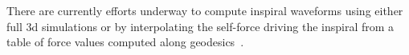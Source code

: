 \documentclass[12pt]{article}
\begin{document}
%
There are currently efforts underway to compute
inspiral waveforms using either full 3d simulations or by interpolating the
self-force driving the inspiral from a
table of force values computed along
geodesics~\cite{Diener:2011cc, Warburton:2011fk}.



\end{document}
